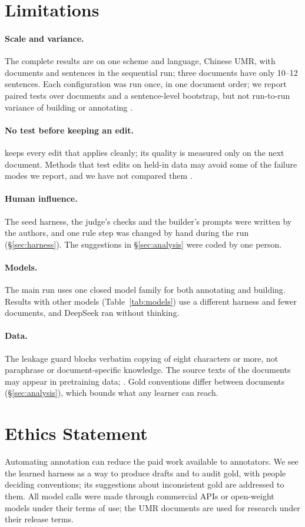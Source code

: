 \section*{Limitations}
\label{sec:limitations}

\paragraph{Scale and variance.} The complete results are on one scheme and language, Chinese UMR, with \nDocs{} documents and \nSentences{} sentences in the sequential run; three documents have only 10--12 sentences. Each configuration was run once, in one document order; we report paired tests over documents and a sentence-level bootstrap, but not run-to-run variance of building or annotating .

\paragraph{No test before keeping an edit.} \sys keeps every edit that applies cleanly; its quality is measured only on the next document. Methods that test edits on held-in data may avoid some of the failure modes we report, and we have not compared them .

\paragraph{Human influence.} The seed harness, the judge's checks and the builder's prompts were written by the authors, and one rule step was changed by hand during the run (\S\ref{sec:harness}). The suggestions in \S\ref{sec:analysis} were coded by one person.

\paragraph{Models.} The main run uses one closed model family for both annotating and building. Results with other models (Table~\ref{tab:models}) use a different harness and fewer documents, and DeepSeek ran without thinking.

\paragraph{Data.} The leakage guard blocks verbatim copying of eight characters or more, not paraphrase or document-specific knowledge. The source texts of the documents may appear in pretraining data; . Gold conventions differ between documents (\S\ref{sec:analysis}), which bounds what any learner can reach.

\section*{Ethics Statement}
Automating annotation can reduce the paid work available to annotators. We see the learned harness as a way to produce drafts and to audit gold, with people deciding conventions; its suggestions about inconsistent gold are addressed to them. All model calls were made through commercial APIs or open-weight models under their terms of use; the UMR documents are used for research under their release terms.
